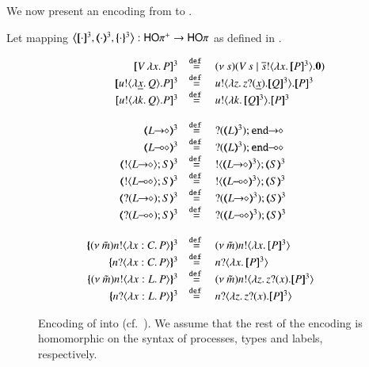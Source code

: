 We now present an encoding from \HOpp to \HOp.
%
\begin{definition}\rm
	\label{def:enc:HOpp_to_HOp}
	Let mapping $\enco{\pmap{\cdot}{3}, \tmap{\cdot}{3}, \mapa{\cdot}^{3}}: \HOpp \to \HOp$
	as defined in .
\end{definition}
%
\begin{figure}[t]
	\[
	\begin{array}{rcl}
		\pmap{\appl{V}{\abs{x} P}}{3} &\defeq& \newsp{s}{\appl{V}{s} \Par \bout{\dual{s}}{\abs{x} \pmap{P}{3}} \inact}
		\\
		\pmap{\bout{u}{\abs{\underline{x}}{Q}} P}{3} &\defeq& \bout{u}{\abs{z}{\binp{z}{\underline{x}} \pmap{Q}{3}}} \pmap{P}{3}
		\\
		\pmap{\bout{u}{\abs{k}{Q}} P}{3} &\defeq& \bout{u}{\abs{k}{\pmap{Q}{3}}} \pmap{P}{3}
		\\
		\\
		\tmap{\shot{L}}{3} &\defeq& \shot{\btinp{\tmap{L}{3}} \tinact}
		\\
		\tmap{\lhot{L}}{3} &\defeq& \lhot{\btinp{\tmap{L}{3}} \tinact}
		\\
		\tmap{\btout{\shot{L}} S}{3} &\defeq& \btout{\tmap{\shot{L}}{3}} \tmap{S}{3}
		\\
		\tmap{\btout{\lhot{L}} S}{3} &\defeq& \btout{\tmap{\lhot{L}}{3}} \tmap{S}{3}
		\\
		\tmap{\btinp{\shot{L}} S}{3} &\defeq& \btinp{\tmap{\shot{L}}{3}} \tmap{S}{3}
		\\
		\tmap{\btinp{\lhot{L}} S}{3} &\defeq& \btinp{\tmap{\lhot{L}}{3}} \tmap{S}{3}
		\\
		\\
		\mapa{\news{\tilde{m}} \bactout{n}{\abs{x:C}{P}}}^{3} &\defeq& \news{\tilde{m}} \bactout{n}{\abs{x}{\pmap{P}{3}}}
		\\
		\mapa{\bactinp{n}{\abs{x:C}{P}}}^{3} &\defeq& \bactinp{n}{\abs{x}{\pmap{P}{3}}}
		\\
		\mapa{\news{\tilde{m}} \bactout{n}{\abs{x:L}{P}}}^{3} &\defeq& \news{\tilde{m}} \bactout{n}{\abs{z}{\binp{z}{x} \pmap{P}{3}}}
		\\
		\mapa{\bactinp{n}{\abs{x:L}{P}}}^{3} &\defeq& \bactinp{n}{\abs{z}{\binp{z}{x} \pmap{P}{3}}}

	\end{array}
	\]
%
	\caption{Encoding of \HOpp into \HOp (cf.~).
	We assume that the rest of the encoding is homomorphic on the syntax of
	processes, types and labels, respectively. \label{fig:enc:HOpp_to_HOp}}
\end{figure}

